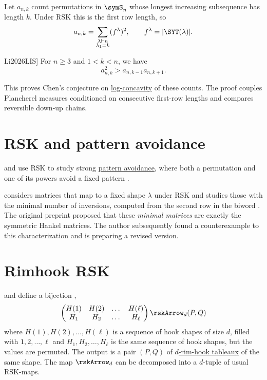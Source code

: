 Let $a_{n,k}$ count permutations in $\symS_n$ whose longest increasing
subsequence has length $k$. Under RSK this is the first row length, so
\[
 a_{n,k}=\sum_{\substack{\lambda\vdash n\\\lambda_1=k}}(f^\lambda)^2,
 \qquad f^\lambda=|\SYT(\lambda)|.
\]
\begin{theorem}[Li, \cite[Thm.~1.1]{Li2026LIS}]
For $n\geq3$ and $1<k<n$, we have
\[
 a_{n,k}^2>a_{n,k-1}a_{n,k+1}.
\]
\end{theorem}
This proves Chen's conjecture on
\hyperref[logConcavePolynomial]{log-concavity} of these counts.
The proof couples Plancherel measures conditioned on consecutive first-row
lengths and compares reversible down-up chains.

\section[patternsAndRSK]{RSK and pattern avoidance}

 and  use RSK to study strong
\hyperref[permutationPattern]{pattern avoidance}, where both a permutation
and one of its powers avoid a fixed pattern
\cite{BurcroffDefant2020}.



 considers matrices that map to a fixed shape $\lambda$
under RSK and studies those with the minimal number of inversions, computed
from the second row in the biword \cite{Pahuja2026x}.  The original preprint
proposed that these \emph{minimal matrices} are exactly the symmetric Hankel
matrices.  The author subsequently found a counterexample to this
characterization and is preparing a revised version.



\section[rimHookRSK]{Rimhook RSK}

 and  define a bijection
\cite[Thm.~3]{StantonWhite1985},
\[
\begin{pmatrix}
H(1)& H(2)& \dotsc & H(\ell) \\
H_1& H_2& \dotsc & H_\ell \\
\end{pmatrix}
\rskArrow_{d}
(P,Q)
\]
where $H(1), H(2),\dotsc, H(\ell)$ is a sequence of hook shapes of size $d$,
filled with $1,2,\dotsc,\ell$ and $H_1, H_2, \dotsc, H_\ell$
is the same sequence of hook shapes, but the values are permuted.
The output is a pair $(P,Q)$ of
\hyperref[borderStripTableauxDefinition]{$d$-rim-hook tableaux} of the same shape.
The map $\rskArrow_{d}$ can be decomposed into a $d$-tuple of usual RSK-maps.


